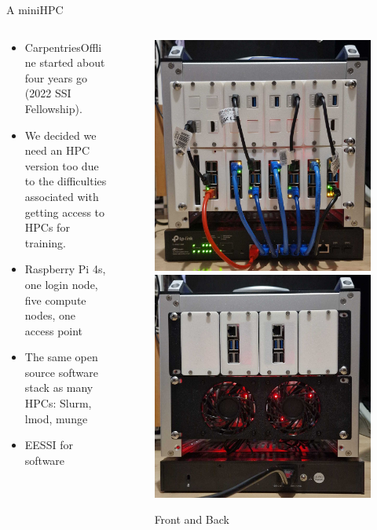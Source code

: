 \begin{frame}{A miniHPC}
	\begin{columns}[T]
		\begin{column}[c]{.6\textwidth}
			\begin{itemize}
				\item CarpentriesOffline started about four years go (2022 SSI Fellowship).
				\item We decided we need an HPC version too due to the difficulties associated with getting access to HPCs for training.
				\item Raspberry Pi 4s, one login node, five compute nodes, one access point
				\item The same open source software stack as many HPCs: Slurm, lmod, munge
				\item EESSI for software
				
			\end{itemize}
		\end{column}
		
		\begin{column}[c]{.5\textwidth}
			\begin{figure}
				\includegraphics[width=.4\columnwidth]{images/mini-HPC-proto3.png} 
				\includegraphics[width=.4\columnwidth]{images/mini-HPC-proto3_back.png}
				\caption*{Front and Back}
			\end{figure}
		\end{column}
	\end{columns}
	
\end{frame}